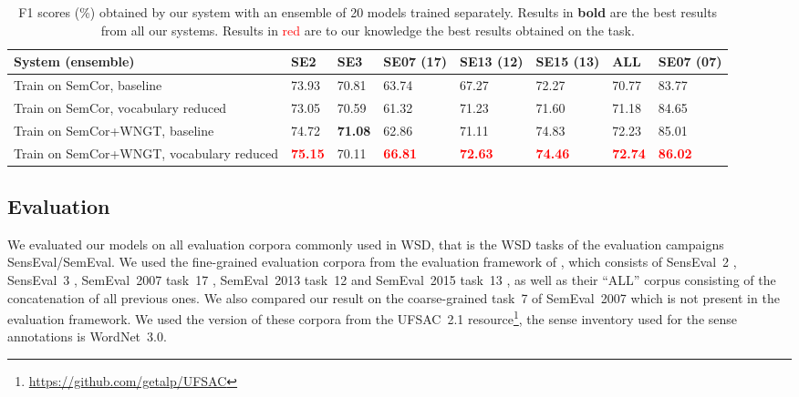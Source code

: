 \documentclass[11pt,a4paper]{article}
\newcommand{\tbf}[1]{\textbf{#1}}
\begin{document}
\begin{table*}[htbp]
\small
\begin{center}
\tabulinesep=2pt
\begin{tabu} to \linewidth {X[5lm]X[1cm]X[1cm]X[1cm]X[1cm]X[1cm]X[1cm]X[1cm]} \toprule
System (ensemble) & SE2 & SE3 & SE07 (17) & SE13 (12) & SE15 (13) & ALL & SE07 (07) \\
\midrule
Train on SemCor, baseline & 73.93 & 70.81 & 63.74 & 67.27 & 72.27 & 70.77 & 83.77 \\
 Train on SemCor, vocabulary reduced & 73.05 & 70.59 & 61.32 & 71.23 & 71.60 & 71.18 & 84.65 \\
Train on SemCor+WNGT, baseline & 74.72 & \tbf{71.08} & 62.86 & 71.11 & 74.83 & 72.23 & 85.01 \\
 Train on SemCor+WNGT, vocabulary reduced & \textcolor{red}{\tbf{75.15}} & 70.11 & \textcolor{red}{\tbf{66.81}} & \textcolor{red}{\tbf{72.63}} & \textcolor{red}{\tbf{74.46}} & \textcolor{red}{\tbf{72.74}} & \textcolor{red}{\tbf{86.02}} \\
\bottomrule
\end{tabu}
\end{center}
\caption{F1 scores (\%) obtained by our system with an ensemble of 20 models trained separately. Results in \tbf{bold} are the best results from all our systems. Results in \textcolor{red}{red} are to our knowledge the best results obtained on the task.}
\label{tab:scores2}
\end{table*}

\subsection{Evaluation}





We evaluated our models on all evaluation corpora commonly used in WSD, that is the WSD tasks of the evaluation campaigns SensEval/SemEval. 
We used the fine-grained evaluation corpora from the evaluation framework of \citet{raganatocamachocolladosnavigli2017}, which consists of SensEval~2 \citep{Edmonds2001}, SensEval~3 \citep{W040811}, SemEval~2007 task~17 \citep{Pradhan2007}, SemEval~2013 task~12 \citep{Navigli2013} and SemEval~2015 task~13 \citep{moronavigli2015}, as well as their ``ALL'' corpus consisting of the concatenation of all previous ones. We also compared our result on the coarse-grained task~7 of SemEval~2007 \citep{Navigli2007} which is not present in the evaluation framework. We used the version of these corpora from the UFSAC~2.1 resource\footnote{\url{https://github.com/getalp/UFSAC}}, the sense inventory used for the sense annotations is WordNet~3.0.
\end{document}
